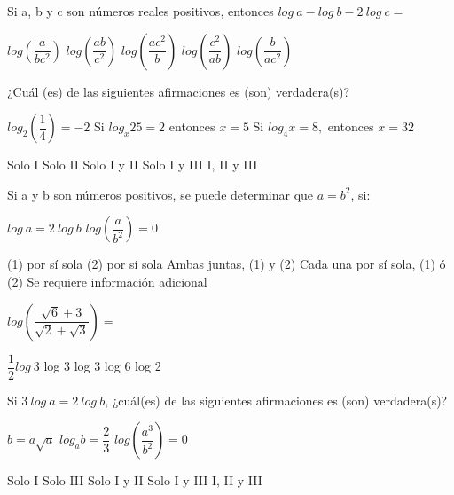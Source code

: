 \documentclass[pagina vacia]{srs}
\begin{document}
\begin{preguntas}
\pregunta Si a, b y c son números reales positivos, entonces $log~a-log~b-2~log~c=$
\begin{vertical}
\alternativa $log\left(\dfrac{a}{bc^{2}}\right)$
\alternativa $log\left(\dfrac{ab}{c^{2}}\right)$
\alternativa $log\left(\dfrac{ac^{2}}{b}\right)$
\alternativa $log\left(\dfrac{c^{2}}{ab}\right)$
\alternativa $log\left(\dfrac{b}{ac^{2}}\right)$
\end{vertical}

\pregunta ¿Cuál (es) de las siguientes afirmaciones es (son) verdadera(s)?
\begin{verticali}
\alternativa $log_{2}\left(\dfrac{1}{4}\right)=-2$
\alternativa Si $log_{x}25=2$ entonces $x=5$
\alternativa Si $log_{4}x=8,$ entonces $x=32$
\end{verticali}
\begin{vertical}
\alternativa Solo I
\alternativa Solo II
\alternativa Solo I y II
\alternativa Solo I y III
\alternativa I, II y III
\end{vertical}

\pregunta Si a y b son números positivos, se puede determinar que $a=b^{2}$, si:
\begin{verticaln}
\alternativa $log~a=2~log~b$
\alternativa $log\left(\dfrac{a}{b^{2}}\right)=0$
\end{verticaln}
\begin{vertical}
\alternativa (1) por sí sola
\alternativa (2) por sí sola
\alternativa Ambas juntas, (1) y (2)
\alternativa Cada una por sí sola, (1) ó (2)
\alternativa Se requiere información adicional
\end{vertical}

\pregunta $log\left(\dfrac{\sqrt{6}+3}{\sqrt{2}+\sqrt{3}}\right)=$
\begin{vertical}
\alternativa $\dfrac{1}{2}log~3$
\alternativa log 3
 log 3
\alternativa log 6
\alternativa log 2
\end{vertical}

\pregunta Si $3~log~a=2~log~b$, ¿cuál(es) de las siguientes afirmaciones es (son) verdadera(s)?
\begin{verticali}
\alternativa $b=a\sqrt{a}$
\alternativa $log_{a}b=\dfrac{2}{3}$
\alternativa $log\left(\dfrac{a^{3}}{b^{2}}\right)=0$
\end{verticali}
\begin{vertical}
\alternativa Solo I
\alternativa Solo III
\alternativa Solo I y II
\alternativa Solo I y III
\alternativa I, II y III
\end{vertical}


\end{preguntas}
\end{document}
